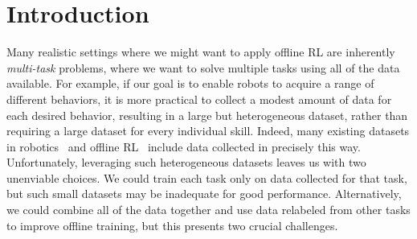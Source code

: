 \documentclass[../thesis.tex]{subfiles}
\begin{document}

\vspace{-0.2cm}
\section{Introduction}
\vspace{-0.2cm}

Many realistic settings where we might want to apply offline RL are inherently \emph{multi-task} problems, where we want to solve multiple tasks using all of the data available. For example, if our goal is to enable robots to acquire a range of different behaviors, it is more practical to collect a modest amount of data for each desired behavior, resulting in a large but heterogeneous dataset, rather than requiring a large dataset for every individual skill. Indeed, many existing datasets in robotics~\citep{finn2017deep,dasari2020robonet,sharma2018multiple} and offline RL~\citep{fu2020d4rl} include data collected in precisely this way. Unfortunately, leveraging such heterogeneous datasets leaves us with two unenviable choices. We could train each task only on data collected for that task, but such small datasets may be inadequate for good performance. Alternatively, we could combine all of the data together and use data relabeled from other tasks to improve offline training, but this presents two crucial challenges.
\end{document}
